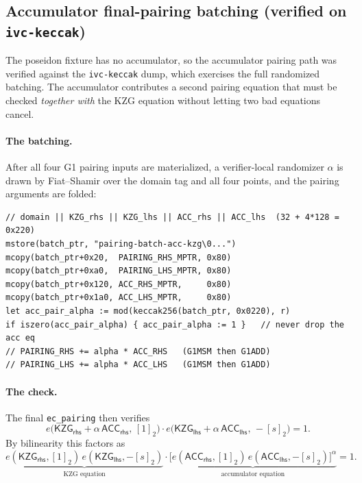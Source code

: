 \subsection{Accumulator final-pairing batching (verified on \texttt{ivc-keccak})}
\label{sec:acc-pairing-verify}

The poseidon fixture has no accumulator, so the accumulator pairing path
was verified against the \texttt{ivc-keccak} dump, which exercises the
full randomized batching. The accumulator contributes a second pairing
equation that must be checked \emph{together with} the KZG equation
without letting two bad equations cancel.

\paragraph{The batching.} After all four G1 pairing inputs are
materialized, a verifier-local randomizer $\alpha$ is drawn by
Fiat--Shamir over the domain tag and all four points, and the pairing
arguments are folded:
\begin{lstlisting}[style=yul]
// domain || KZG_rhs || KZG_lhs || ACC_rhs || ACC_lhs  (32 + 4*128 = 0x220)
mstore(batch_ptr, "pairing-batch-acc-kzg\0...")
mcopy(batch_ptr+0x20,  PAIRING_RHS_MPTR, 0x80)
mcopy(batch_ptr+0xa0,  PAIRING_LHS_MPTR, 0x80)
mcopy(batch_ptr+0x120, ACC_RHS_MPTR,     0x80)
mcopy(batch_ptr+0x1a0, ACC_LHS_MPTR,     0x80)
let acc_pair_alpha := mod(keccak256(batch_ptr, 0x0220), r)
if iszero(acc_pair_alpha) { acc_pair_alpha := 1 }   // never drop the acc eq
// PAIRING_RHS += alpha * ACC_RHS   (G1MSM then G1ADD)
// PAIRING_LHS += alpha * ACC_LHS   (G1MSM then G1ADD)
\end{lstlisting}

\paragraph{The check.} The final \texttt{ec\_pairing} then verifies
\begin{equation}
e\!\big(\mathsf{KZG_{rhs}} + \alpha\,\mathsf{ACC_{rhs}},\,[1]_2\big)\cdot
e\!\big(\mathsf{KZG_{lhs}} + \alpha\,\mathsf{ACC_{lhs}},\,-[s]_2\big) = 1 .
\label{eq:acc-batch-check}
\end{equation}
By bilinearity this factors as
\begin{equation}
\underbrace{e(\mathsf{KZG_{rhs}},[1]_2)\,e(\mathsf{KZG_{lhs}},-[s]_2)}_{\text{KZG equation}}
\cdot
\underbrace{\big[e(\mathsf{ACC_{rhs}},[1]_2)\,e(\mathsf{ACC_{lhs}},-[s]_2)\big]^{\alpha}}_{\text{accumulator equation}}
= 1 .
\label{eq:acc-batch-factor}
\end{equation}

